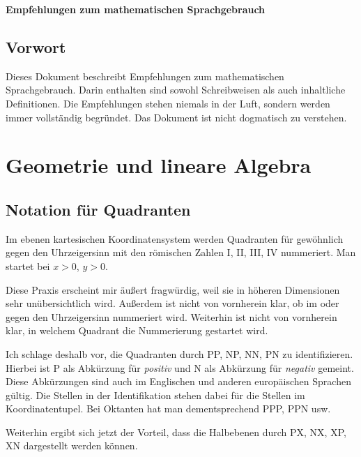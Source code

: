 \documentclass[a4paper,11pt,fleqn]{article}
\begin{document}
\thispagestyle{empty}

\begin{huge}
\noindent
\textbf{Empfehlungen zum mathematischen Sprachgebrauch}
\par
\end{huge}

\tableofcontents

\subsection*{Vorwort}
Dieses Dokument beschreibt Empfehlungen zum mathematischen
Sprachgebrauch. Darin enthalten sind sowohl Schreibweisen als
auch inhaltliche Definitionen. Die Empfehlungen stehen niemals
in der Luft, sondern werden immer vollständig begründet.
Das Dokument ist nicht dogmatisch zu verstehen.

\section{Geometrie und lineare Algebra}
\subsection{Notation für Quadranten}
Im ebenen kartesischen Koordinatensystem werden Quadranten für
gewöhnlich gegen den Uhrzeigersinn mit den römischen Zahlen
I, II, III, IV nummeriert. Man startet bei $x>0$, $y>0$.

Diese Praxis erscheint mir äußert fragwürdig, weil sie in höheren
Dimensionen sehr unübersichtlich wird. Außerdem ist nicht von
vornherein klar, ob im oder gegen den Uhrzeigersinn nummeriert wird.
Weiterhin ist nicht von vornherein klar, in welchem Quadrant
die Nummerierung gestartet wird.

Ich schlage deshalb vor, die Quadranten durch PP, NP, NN, PN
zu identifizieren. Hierbei ist P als Abkürzung für \emph{positiv}
und N als Abkürzung für \emph{negativ} gemeint. Diese Abkürzungen sind
auch im Englischen und anderen europäischen Sprachen gültig.
Die Stellen in der Identifikation stehen dabei für die Stellen
im Koordinatentupel. Bei Oktanten hat man dementsprechend PPP, PPN
usw.

Weiterhin ergibt sich jetzt der Vorteil, dass die Halbebenen durch
PX, NX, XP, XN dargestellt werden können.
\end{document}
